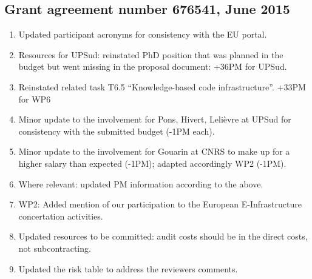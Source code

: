 \documentclass[noworkareas,deliverables,\classoptions]{euproposal}       %
\begin{document}
\begin{proposal}
\subsection*{Grant agreement number 676541, June 2015}

\begin{enumerate}
\item Updated participant acronyms for consistency with the EU portal.

\item Resources for UPSud: reinstated PhD position that was planned in
  the budget but went missing in the proposal document: +36PM for UPSud.
\item Reinstated related task T6.5 ``Knowledge-based code infrastructure''.
  +33PM for WP6
\item Minor update to the involvement for Pons, Hivert, Lelièvre at
  UPSud for consistency with the submitted budget (-1PM each).
\item Minor update to the involvement for Gouarin at CNRS to make up
  for a higher salary than expected (-1PM); adapted accordingly WP2
  (-1PM).
\item Where relevant: updated PM information according to the above.

\item WP2: Added mention of our participation to the European
  E-Infrastructure concertation activities.

\item Updated resources to be committed: audit costs should be in the
  direct costs, not subcontracting.

\item Updated the risk table to address the reviewers comments.


\end{enumerate}
\end{proposal}
\end{document}
